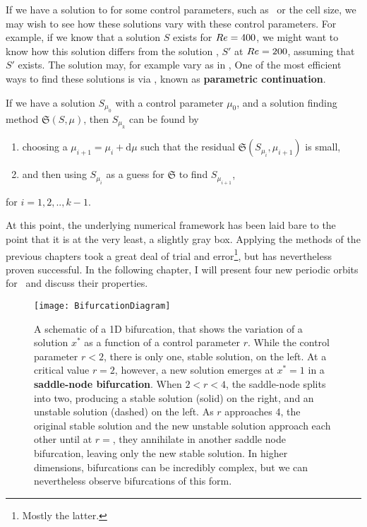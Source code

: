  If we have a solution to  for some control parameters, such as \ReN\ or the cell size, we may wish to see how these solutions vary with these control parameters. For example, if we know that a solution $S$  exists for $Re = 400$, we might want to know how this solution differs from the solution , $S'$ at $Re = 200$, assuming that $S'$ exists. The solution may, for example vary as in ,  One of the most efficient ways to find these solutions is via , known as {\bf parametric continuation}.
 \begin{algorithm}\label{alg:parCont}
 If we have a solution $S_{\mu_0}$ with a control parameter $\mu_0$,  and a solution finding method $\mathfrak{S}(S,\mu)$, then $S_{\mu_k}$ can be found by
 \begin{enumerate}
 \item choosing a $\mu_{i+1} = \mu_{i} + \mathrm{d}\mu$ such that the residual $\mathfrak{S}(S_{\mu_{i}},\mu_{i+1})$ is small,
 \item and then using $S_{\mu_i}$ as a guess for $\mathfrak{S}$ to find $S_{\mu_{i+1}}$,
 \end{enumerate}
 for $i = 1,2,..,k-1$.
 \end{algorithm}
\par
At this point, the underlying numerical framework has been laid bare to the point that it is at the very least, a slightly gray box. Applying the methods of the previous chapters took a great deal of trial and error\footnote{Mostly the latter.}, but has nevertheless proven successful. In the following chapter, I will present four new periodic orbits for \pCf\, and discuss their properties.   
 \begin{figure}[h]
 \centerline{\texttt{[image: BifurcationDiagram]}}
 \caption{A schematic of a 1D bifurcation, that shows the variation of a solution $x^*$ as a function of a control parameter $r$. While the control parameter $r < 2$, there is only one, stable solution, on the left. At a critical value $r = 2$, however, a new solution emerges at $x^* = 1$ in a {\bf saddle-node bifurcation}. When $2 < r < 4$, the saddle-node splits into two, producing a stable solution (solid) on the right, and an unstable solution (dashed) on the left. As $r$ approaches 4, the original stable solution and the new unstable solution approach each other until at $r=$, they annihilate in another saddle node bifurcation, leaving only the new stable solution. In higher dimensions, bifurcations can be incredibly complex, but we can nevertheless observe bifurcations of this form. }\label{fig:bifurcations}
 \end{figure}
 
 